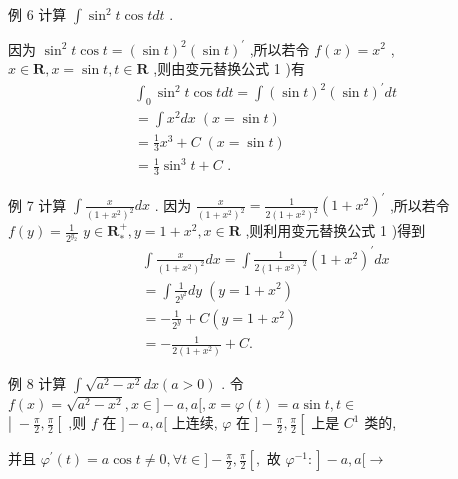 例 6 计算 $\int {\sin }^{2}t\cos {tdt}$ .

因为 ${\sin }^{2}t\cos t = {\left( \sin t\right) }^{2}{\left( \sin t\right) }^{\prime }$ ,所以若令 $f\left( x\right)  = {x}^{2}$ , $x \in  \mathbf{R},x = \sin t,t \in  \mathbf{R}$ ,则由变元替换公式 1 )有
\begin{align*}
	&{\int }_{0}{\sin }^{2}t\cos {tdt} = \int {\left( \sin t\right) }^{2}{\left( \sin t\right) }^{\prime }{dt}\\
	&= \int {x}^{2}{dx}\;\left( {x = \sin t}\right)\\
	&= \frac{1}{3}{x}^{3} + C\;\left( {x = \sin t}\right)\\
	&= \frac{1}{3}{\sin }^{3}t + C\text{ . }
\end{align*}

例 7 计算 $\int \frac{x}{{\left( 1 + {x}^{2}\right) }^{2}}{dx}$ . 因为 $\frac{x}{{\left( 1 + {x}^{2}\right) }^{2}} = \frac{1}{2{\left( 1 + {x}^{2}\right) }^{2}}{\left( 1 + {x}^{2}\right) }^{\prime }$ ,所以若令 $f\left( y\right)  = \frac{1}{{2}^{{y}_{2}}}$  $y \in  {\mathbf{R}}_{ * }^{ + },y = 1 + {x}^{2},x \in  \mathbf{R}$ ,则利用变元替换公式 1 )得到
\begin{align*}
	&\int \frac{x}{{\left( 1 + {x}^{2}\right) }^{2}}{dx} = \int \frac{1}{2{\left( 1 + {x}^{2}\right) }^{2}}{\left( 1 + {x}^{2}\right) }^{\prime }{dx}\\
	&= \int \frac{1}{{2}^{{y}^{2}}}{dy}\;\left( {y = 1 + {x}^{2}}\right)\\
	&=  - \frac{1}{{2}^{y}} + C\left( {y = 1 + {x}^{2}}\right)\\
	&=  - \frac{1}{2\left( {1 + {x}^{2}}\right) } + C.
\end{align*}

例 8 计算 $\int \sqrt{{a}^{2} - {x}^{2}}{dx}\left( {a > 0}\right)$ . 令 $f\left( x\right)  = \sqrt{{a}^{2} - {x}^{2}},x \in  \rbrack  - a,a\lbrack ,x = \varphi \left( t\right)  = a\sin t,t \in$  $\left| {\; - \frac{\pi }{2},\frac{\pi }{2}\left\lbrack  {\text{ ,则 }f\text{ 在 }\rbrack  - a,a\lbrack }\right. }\right.$ 上连续, $\varphi$ 在 $\rbrack  - \frac{\pi }{2},\frac{\pi }{2}\left\lbrack  {\text{ 上是 }{C}^{1}}\right.$ 类的,

并且 ${\varphi }^{\prime }\left( t\right)  = a\cos t \neq  0,\forall t \in  \rbrack  - \frac{\pi }{2},\frac{\pi }{2}\left\lbrack  {,\text{ 故 }{\varphi }^{-1} : }\right\rbrack   - a,a\lbrack  \rightarrow$

